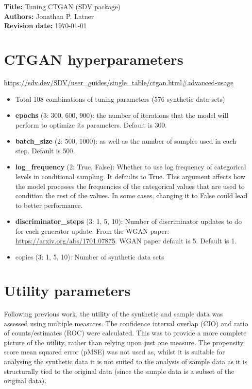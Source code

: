 \documentclass[12pt]{article}
\begin{document}
{\bf Title:} Tuning CTGAN (SDV package) \\
{\bf Authors:} Jonathan P. Latner \\
{\bf Revision date:} \today

\section{CTGAN hyperparameters}

\url{https://sdv.dev/SDV/user_guides/single_table/ctgan.html#advanced-usage}


\begin{itemize}
    \item Total 108 combinations of tuning parameters (576 synthetic data sets)
    \item {\bf epochs} (3: 300, 600, 900): the number of iterations that the model will perform to optimize its parameters. Default is 300.  
    \item {\bf batch\_size} (2: 500, 1000): as well as the number of samples used in each step. Default is 500.  
    \item {\bf log\_frequency} (2: True, False): Whether to use log frequency of categorical levels in conditional sampling. It defaults to True. This argument affects how the model processes the frequencies of the categorical values that are used to condition the rest of the values. In some cases, changing it to False could lead to better performance.
    \item {\bf discriminator\_steps} (3: 1, 5, 10): Number of discriminator updates to do for each generator update. From the WGAN paper: \url{https://arxiv.org/abs/1701.07875}. WGAN paper default is 5. Default is 1.
    \item copies (3: 1, 5, 10): Number of synthetic data sets
\end{itemize}


\section{Utility parameters}

Following previous work, the utility of the synthetic and sample data was assessed using multiple measures. The confidence interval overlap (CIO) and ratio of counts/estimates (ROC) were calculated. This was to provide a more complete picture of the utility, rather than relying upon just one measure. The propensity score mean squared error (pMSE) was not used as, whilst it is suitable for analysing the synthetic data it is not suited to the analysis of sample data as it is structurally tied to the original data (since the sample data is a subset of the original data).
\end{document}
